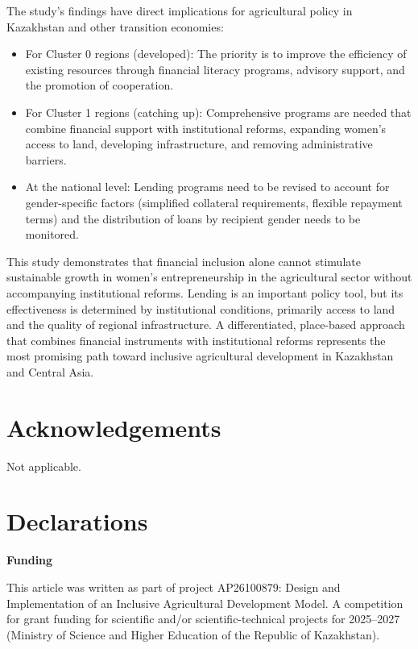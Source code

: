 \documentclass[pdflatex,sn-mathphys-ay]{sn-jnl}
\begin{document}
The study's findings have direct implications for agricultural policy in
Kazakhstan and other transition economies:

\begin{itemize}
\item For Cluster 0 regions (developed): The priority is to improve the
efficiency of existing resources through financial literacy programs,
advisory support, and the promotion of cooperation.
\item For Cluster 1 regions (catching up): Comprehensive programs are
needed that combine financial support with institutional reforms,
expanding women's access to land, developing infrastructure, and
removing administrative barriers.
\item At the national level: Lending programs need to be revised to
account for gender-specific factors (simplified collateral
requirements, flexible repayment terms) and the distribution of loans by
recipient gender needs to be monitored.
\end{itemize}

This study demonstrates that financial inclusion alone cannot stimulate
sustainable growth in women's entrepreneurship in the agricultural
sector without accompanying institutional reforms. Lending is an
important policy tool, but its effectiveness is determined by
institutional conditions, primarily access to land and the quality of
regional infrastructure. A differentiated, place-based approach that
combines financial instruments with institutional reforms represents the
most promising path toward inclusive agricultural development in
Kazakhstan and Central Asia.

\backmatter

\section*{Acknowledgements}

Not applicable.

\section*{Declarations}

\noindent\textbf{Funding}

This article was written as part of project AP26100879: Design and
Implementation of an Inclusive Agricultural Development Model. A
competition for grant funding for scientific and/or scientific-technical
projects for 2025--2027 (Ministry of Science and Higher Education of the
Republic of Kazakhstan).
\end{document}
